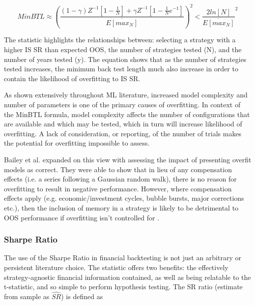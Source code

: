 \documentclass[a4paper,11pt,oneside]{article}
\theoremstyle{plain}
\theoremstyle{definition}
\begin{document}
\begin{equation}\label{MinBTL}
MinBTL \approx (\frac{
                                  (1-\gamma)Z^{-1}[1-\frac{1}{N}] + \gamma Z^{-1}[1 -\frac{1}{N}e^{-1}]}
                                  {\overline{E[max_N]}})^2
                                  < \frac{2ln[N]}{\overline{E[max_N]}}^2
\end{equation}

The statistic highlights the relationships between: selecting a strategy with a higher IS SR than expected OOS, 
the number of strategies tested (N), and the number of years tested (y). The equation shows that  as the number 
of strategies tested increases, the minimum back test length much also increase in order to contain the likelihood 
of overfitting to IS SR. 
\hfill \break 

As shown extensively throughout ML literature, increased model complexity and number of parameters is one of 
the primary causes of overfitting. In context of the MinBTL formula, model complexity affects the number of 
configurations that are available and which may be tested, which in turn will increase likelihood of overfitting. 
A lack of consideration, or reporting, of the number of trials makes the potential for overfitting impossible to assess. 
\hfill \break 

Bailey et al. expanded on this view with assessing the impact of presenting overfit models as correct. 
They were able to show that in lieu of any compensation effects (i.e. a series following a Gaussian random walk), 
there is no reason for overfitting to result in negative performance. However, where compensation effects apply 
(e.g. economic/investment cycles, bubble bursts, major corrections etc.), then the inclusion of memory in a strategy
 is likely to be detrimental to OOS performance if overfitting isn’t controlled for \cite{BaileyBTL}.
\hfill \break 

\subsubsection {Sharpe Ratio}

The use of the Sharpe Ratio in financial backtesting is not just an arbitrary or persistent literature choice. 
The statistic offers two benefits: the effectively strategy-agnostic financial information contained, as well as being 
relatable to the t-statistic, and so simple to perform hypothesis testing. The SR ratio (estimate from sample as $\hat{SR}$) 
is defined as
\end{document}
